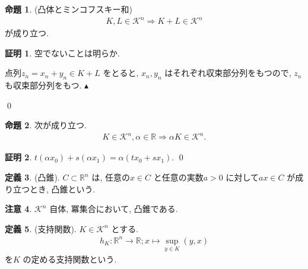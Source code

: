 \documentclass[10pt, fleqn, label-section=none]{bxjsarticle}
\theoremstyle{definition}
\newtheorem{dfn}{定義}[section]
\newtheorem{prop}[dfn]{命題}
\newtheorem*{pf*}{証明}
\newtheorem{remark}[dfn]{注意}
\newcommand{\naraba}{\Rightarrow}
\renewcommand{\;}{\, ; \,}
\newenvironment{claim}[1]{\par\noindent\underline{step:}\space#1}{}
\newenvironment{claimproof}[1]{\par\noindent{($\because$)}\space#1}{\hfill $\blacktriangle $}
\begin{document}
\begin{prop}(凸体とミンコフスキー和) 
\begin{align*} K, L \in \mathcal K ^n \naraba K + L \in \mathcal K ^n \end{align*}
が成り立つ.
\end{prop}
\begin{pf*}空でないことは明らか. 
\begin{claimproof}
点列$z_n = x_n + y_n \in K+ L$ をとると, $x_n, y_n$ はそれぞれ収束部分列をもつので, $z_n$ も収束部分列をもつ.  
\end{claimproof}

\qed
\end{pf*}

\begin{prop}次が成り立つ.
\begin{align*} K \in \mathcal K ^n, \alpha \in \mathbb R \naraba \alpha K \in \mathcal K ^n. \end{align*}
\end{prop}
\begin{pf*}
$t(\alpha x_0) + s(\alpha x_1) = \alpha (t x_0 + s x_1).$
\qed
\end{pf*}

\begin{dfn}(凸錐). $C \subset \mathbb R^n$ は, 任意の$x \in C$ と任意の実数$a > 0$ に対して$ax \in C$ が成り立つとき, 凸錐という. 

\end{dfn}

\begin{remark}$\mathcal K ^n$ 自体, 冪集合において, 凸錐である. 

\end{remark}


\begin{dfn}(支持関数). $K \in \mathcal K^n$ とする. 
\begin{align*} h_K: \mathbb R^n \rightarrow \mathbb R; x \mapsto \sup_{y \in K} (y, x)\end{align*}
を$K$ の定める支持関数という. 
\end{dfn}
\end{document}

